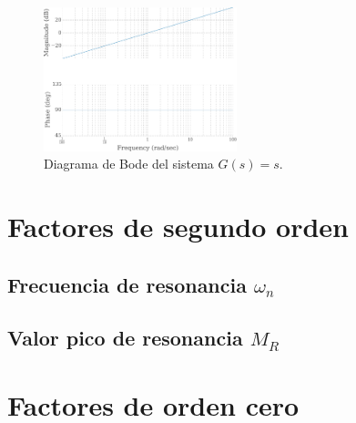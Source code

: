             \begin{figure}
                \centering
                \includegraphics[width=0.5\textwidth]{./imagenes/bodederivativo.pdf}
                \caption{\label{fig:bodederivativo}Diagrama de Bode del sistema $G(s) = s$.}
            \end{figure}

    \newpage
    \section{Factores de segundo orden}
        \subsection{Frecuencia de resonancia $\omega_n$}
        \subsection{Valor pico de resonancia $M_R$}

    \newpage
    \section{Factores de orden cero}
